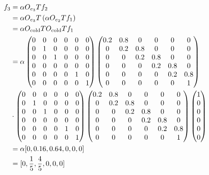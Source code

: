 \documentclass[12pt]{article}
\begin{document}
\begin{align*}
    f_3 &= \alpha O_{e_3} T f_2 \\
    &= \alpha O_{e_3} T \left (\alpha O_{e_2} T f_1 \right) \\
    &= \alpha O_{\text{cold}} T  O_{\text{cold}} T f_1 \\
    &= \alpha 
    \begin{pmatrix}
        0 & 0 & 0 & 0 & 0 & 0 \\
        0 & 1 & 0 & 0 & 0 & 0 \\
        0 & 0 & 1 & 0 & 0 & 0 \\
        0 & 0 & 0 & 0 & 0 & 0 \\
        0 & 0 & 0 & 0 & 1 & 0 \\
        0 & 0 & 0 & 0 & 0 & 1 \\
    \end{pmatrix}
    \begin{pmatrix}
        0.2 & 0.8 & 0 & 0 & 0 & 0 \\
        0 & 0.2 & 0.8 & 0 & 0 & 0 \\
        0 & 0 & 0.2 & 0.8 & 0 & 0 \\
        0 & 0 & 0 & 0.2 & 0.8 & 0 \\
        0 & 0 & 0 & 0 & 0.2 & 0.8 \\
        0 & 0 & 0 & 0 & 0 & 1 \\
    \end{pmatrix} \\
    & \cdot
    \begin{pmatrix}
        0 & 0 & 0 & 0 & 0 & 0 \\
        0 & 1 & 0 & 0 & 0 & 0 \\
        0 & 0 & 1 & 0 & 0 & 0 \\
        0 & 0 & 0 & 0 & 0 & 0 \\
        0 & 0 & 0 & 0 & 1 & 0 \\
        0 & 0 & 0 & 0 & 0 & 1 \\
    \end{pmatrix}
    \begin{pmatrix}
        0.2 & 0.8 & 0 & 0 & 0 & 0 \\
        0 & 0.2 & 0.8 & 0 & 0 & 0 \\
        0 & 0 & 0.2 & 0.8 & 0 & 0 \\
        0 & 0 & 0 & 0.2 & 0.8 & 0 \\
        0 & 0 & 0 & 0 & 0.2 & 0.8 \\
        0 & 0 & 0 & 0 & 0 & 1 \\
    \end{pmatrix}
    \begin{pmatrix}
        1 \\
        0 \\
        0 \\
        0 \\
        0 \\
        0 \\
    \end{pmatrix} \\
    &= \alpha [0, 0.16, 0.64, 0, 0, 0] \\
    &= [0, \frac{1}{5}, \frac{4}{5}, 0, 0, 0] \\
\end{align*}
\end{document}
